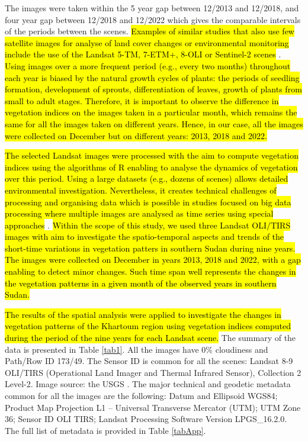 \documentclass[jimaging,article,submit,pdftex,moreauthors]{Definitions/mdpi}
\begin{document}
The images were taken within the 5 year gap between 12/2013 and 12/2018, and four year gap between 12/2018 and 12/2022 which gives the comparable intervals of the periods between the scenes. \hl{Examples of similar studies that also use few satellite images for analyse of land cover changes or environmental monitoring include the use of the Landsat 5-TM, 7-ETM+, 8-OLI or Sentinel-2 scenes} \cite{Hammad_Mucsi,rs14246284,Talebi,essd2022339,Yilmaz,Nasseri}. \hl{Using images over a more frequent period (e.g., every two months) throughout each year is biased by the natural growth cycles of plants: the periods of seedling formation, development of sprouts, differentiation of leaves, growth of plants from small to adult stages. Therefore, it is important to observe the difference in vegetation indices on the images taken in a particular month, which remains the same for all the images taken on different years. Hence, in our case, all the images were collected on December but on different years: 2013, 2018 and 2022.} 

\hl{The selected Landsat images were processed with the aim to compute vegetation indices using the algorithms of R enabling to analyse the dynamics of vegetation over this period. Using a large datasets (e.g., dozens of scenes) allows detailed environmental investigation. Nevertheless, it creates technical challenges of processing and organising data which is possible in studies focused on big data processing where multiple images are analysed as time series using special approaches} \cite{LiWangLu,Veretekhina,Gumma}. \hl{Within the scope of this study, we used three Landsat OLI/TIRS images with aim to investigate the spatio-temporal aspects and trends of the short-time variations in vegetation patters in southern Sudan during nine years. The images were collected on December in years 2013, 2018 and 2022, with a gap enabling to detect minor changes. Such time span well represents the changes in  the vegetation patterns in a given month of the observed years in southern Sudan.}

\hl{The results of the spatial analysis were applied to investigate the changes in vegetation patterns of the Khartoum region using  vegetation indices computed during the period of the nine years for each Landsat scene. }The summary of the data is presented in Table \ref{tab1}. All the images have 0\% cloudiness and Path/Row ID 173/49. The Sensor ID is common for all the scenes: Landsat 8-9 OLI/TIRS (Operational Land Imager and Thermal Infrared Sensor), Collection 2 Level-2. Image source: the USGS \cite{EROS}. The major technical and geodetic metadata common for all the images are the following: Datum and Ellipsoid WGS84; Product Map Projection L1 -- Universal Transverse Mercator (UTM); UTM Zone 36; Sensor ID OLI TIRS; Landsat Processing Software Version LPGS\_16.2.0. The full list of metadata is provided in Table \ref{tabApp}.
\end{document}
